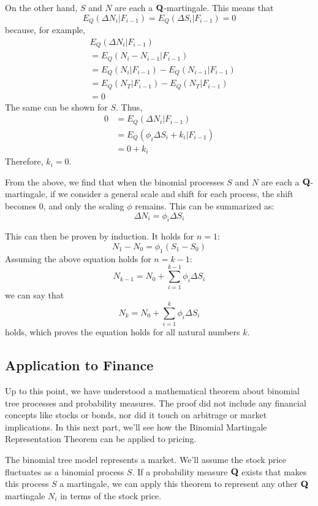\documentclass[uplatex,a4j,12pt,dvipdfmx]{jsarticle}
\begin{document}
On the other hand, $S$ and $N$ are each a ${\bf Q}$-martingale. This means that \[E_Q(\Delta N_i | F_{i-1}) = E_Q(\Delta S_i | F_{i-1}) = 0\] because, for example, \begin{align*}
& E_Q(\Delta N_i | F_{i-1}) \\
&= E_Q( N_i - N_{i-1} | F_{i-1}) \\
&= E_Q( N_i | F_{i-1}) - E_Q( N_{i-1} | F_{i-1}) \\
&= E_Q( N_T | F_{i-1}) - E_Q( N_T | F_{i-1}) \\
&= 0
\end{align*}
The same can be shown for $S$. Thus,
\begin{align*}
0 &= E_Q(\Delta N_i | F_{i-1}) \\
&= E_Q(\phi_i \Delta S_{i} + k_{i} | F_{i-1}) \\
&= 0 + k_{i}
\end{align*}
Therefore, $k_{i} = 0$.

From the above, we find that when the binomial processes $S$ and $N$ are each a ${\bf Q}$-martingale, if we consider a general scale and shift for each process, the shift becomes 0, and only the scaling $\phi$ remains. This can be summarized as: \[\Delta N_{i} = \phi_{i} \Delta S_{i}\]

This can then be proven by induction. It holds for $n=1$: \[N_{1} - N_{0} = \phi_{1} ( S_{1} -S_{0} )\] Assuming the above equation holds for $n=k-1$: \[N_{k-1} = N_{0} + \sum^{k-1}_{i=1} \phi_{i} \Delta S_{i}\] we can say that \[N_{k} = N_{0} + \sum^{k}_{i=1} \phi_{i} \Delta S_{i}\] holds, which proves the equation holds for all natural numbers $k$.

\subsection{Application to Finance}
Up to this point, we have understood a mathematical theorem about binomial tree processes and probability measures. The proof did not include any financial concepts like stocks or bonds, nor did it touch on arbitrage or market implications. In this next part, we'll see how the Binomial Martingale Representation Theorem can be applied to pricing.

The binomial tree model represents a market. We'll assume the stock price fluctuates as a binomial process $S$. If a probability measure ${\bf Q}$ exists that makes this process $S$ a martingale, we can apply this theorem to represent any other ${\bf Q}$ martingale $N_{i}$ in terms of the stock price.
\end{document}
